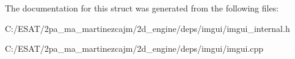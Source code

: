 The documentation for this struct was generated from the following files\+:\begin{DoxyCompactItemize}
\item 
C\+:/\+E\+S\+A\+T/2pa\+\_\+ma\+\_\+martinezcajm/2d\+\_\+engine/deps/imgui/imgui\+\_\+internal.\+h\item 
C\+:/\+E\+S\+A\+T/2pa\+\_\+ma\+\_\+martinezcajm/2d\+\_\+engine/deps/imgui/imgui.\+cpp\end{DoxyCompactItemize}
